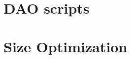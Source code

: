 \documentclass[a4paper,10pt]{article}
\begin{document}
\section{DAO scripts}



\section{Size Optimization}
\end{document}
